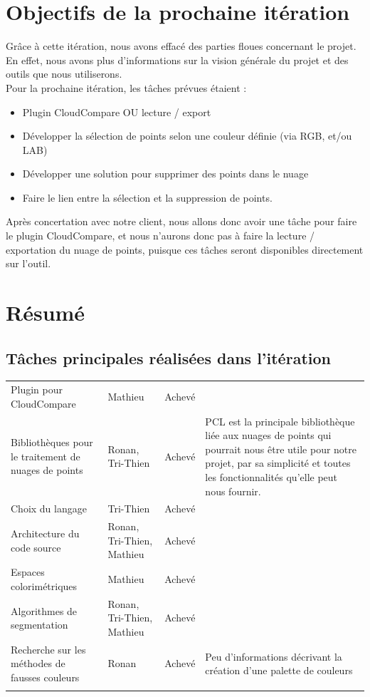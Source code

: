 \documentclass[12pt,titlepage,french]{article}
\begin{document}
\section{Objectifs de la prochaine itération}
Grâce à cette itération, nous avons effacé des parties floues concernant le projet. En effet, nous avons plus d'informations sur la vision générale du projet et des outils que nous utiliserons. \\
Pour la prochaine itération, les tâches prévues étaient :
\begin{itemize}
  \item Plugin CloudCompare OU lecture / export
  \item Développer la sélection de points selon une couleur définie (via RGB, et/ou LAB)
  \item Développer une solution pour supprimer des points dans le nuage
  \item Faire le lien entre la sélection et la suppression de points.
\end{itemize}

Après concertation avec notre client, nous allons donc avoir une tâche pour faire le plugin CloudCompare, et nous n'aurons donc pas à faire la lecture / exportation du nuage de points, puisque ces tâches seront disponibles directement sur l'outil.

\section{Résumé}
\subsection{Tâches principales réalisées dans l'itération}
\noindent\begin{tabu} to \toprule
  &&&\\\toprule
Plugin pour CloudCompare
& Mathieu
& Achevé
& \\\midrule
Bibliothèques pour le traitement de nuages de points
& Ronan, Tri-Thien
& Achevé
& PCL est la principale bibliothèque liée aux nuages de points qui pourrait nous être utile pour notre projet, par sa simplicité et toutes les fonctionnalités qu'elle peut nous fournir.\\\midrule
Choix du langage
& Tri-Thien
& Achevé
& \\\midrule
Architecture du code source
& Ronan, Tri-Thien, Mathieu
& Achevé
& \\\midrule
Espaces colorimétriques
& Mathieu
& Achevé
& \\\midrule
Algorithmes de segmentation
& Ronan, Tri-Thien, Mathieu
& Achevé
& \\\midrule
Recherche sur les méthodes de fausses couleurs
& Ronan
& Achevé
& Peu d'informations décrivant la création d'une palette de couleurs\\\bottomrule  \\
\end{tabu}
\end{document}
